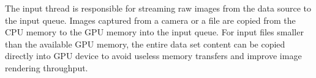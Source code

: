 The input thread is responsible for streaming raw images from the data source to the input queue. Images captured from a camera or a file are copied from the CPU memory to the GPU memory into the input queue. For input files smaller than the available GPU memory, the entire data set content can be copied directly into GPU device to avoid useless memory transfers and improve image rendering throughput.